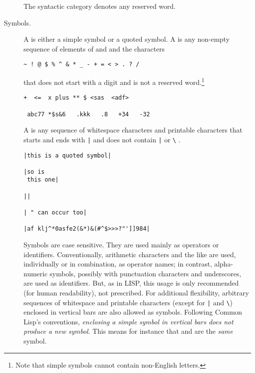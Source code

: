 \begin{description}
The syntactic category  denotes any reserved word.

\item[Symbols.]
A  is either a simple symbol or a quoted symbol.
A  is any non-empty sequence of elements of  and 
 and the characters
\begin{center}
\verb|~ ! @ $ % ^ & * _ - + = < > . ? /|
\end{center}
that does not start with a digit and is not a reserved word.\footnote{%
Note that simple symbols cannot contain non-English letters.
}

\begin{lstlisting}[linewidth=25.5em]
 +  <=  x plus ** $ <sas  <adf> 
 
 abc77 *$s&6   .kkk   .8   +34   -32 
\end{lstlisting}

A  is any sequence of whitespace characters and printable characters
that starts and ends with \verb+|+ and does not contain \verb+|+ or \verb+\+ .
\smallskip

\newpage
\begin{lstlisting}[linewidth=25.5em]
|this is a quoted symbol|

|so is 
 this one|

||

| " can occur too|

|af klj^*0asfe2(&*)&(#^$>>>?"']]984|
\end{lstlisting}

Symbols are case sensitive.
They are used mainly as operators or identifiers.
Conventionally, arithmetic characters and the like are used, 
individually or in combination, as operator names;
in contrast, alpha-numeric symbols, possibly with punctuation characters and underscores, are used as identifiers.
But, as in LISP, this usage is only recommended (for human readability),
not prescribed.
For additional flexibility, arbitrary sequences of whitespace and printable characters 
(except for \verb+|+ and \verb+\+)
enclosed in vertical bars are also allowed as symbols.
Following Common Lisp's conventions, 
\emph{enclosing a simple symbol in vertical bars does not produce a new symbol}.
This means for instance that  and  are the \emph{same} symbol.


\end{description}

